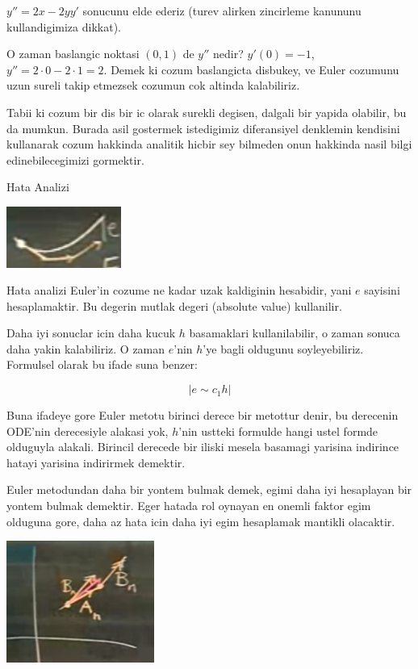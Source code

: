\documentclass[12pt,fleqn]{article}\usepackage{../common}
\begin{document}
$y'' = 2x - 2yy'$ sonucunu elde ederiz (turev alirken zincirleme kanununu
kullandigimiza dikkat).

O zaman baslangic noktasi $(0,1)$ de $y''$ nedir? $y'(0) = -1$, $y''= 2 \cdot 0
- 2\cdot 1 = 2$. 
Demek ki cozum baslangicta disbukey, ve Euler cozumunu uzun sureli takip
etmezsek cozumun cok altinda kalabiliriz. 

Tabii ki cozum bir dis bir ic olarak surekli degisen, dalgali bir yapida
olabilir, bu da mumkun. Burada asil gostermek istedigimiz diferansiyel denklemin
kendisini kullanarak cozum hakkinda analitik hicbir sey bilmeden onun hakkinda
nasil bilgi edinebilecegimizi gormektir. 

Hata Analizi

\includegraphics[height=2cm]{2_3.png}

Hata analizi Euler'in cozume ne kadar uzak kaldiginin hesabidir, yani $e$
sayisini hesaplamaktir. Bu degerin mutlak degeri (absolute value) kullanilir. 

Daha iyi sonuclar icin daha kucuk $h$ basamaklari kullanilabilir, o zaman sonuca
daha yakin kalabiliriz. O zaman $e$'nin $h$'ye bagli oldugunu
soyleyebiliriz. Formulsel olarak bu ifade suna benzer:

\[ |e \sim c_1 h| \]

Buna ifadeye gore Euler metotu birinci derece bir metottur denir, bu derecenin
ODE'nin derecesiyle alakasi yok, $h$'nin ustteki formulde hangi ustel formde
olduguyla alakali. Birincil derecede bir iliski mesela basamagi yarisina
indirince hatayi yarisina indirirmek demektir.

Euler metodundan daha bir yontem bulmak demek, egimi daha iyi hesaplayan bir
yontem bulmak demektir. Eger hatada rol oynayan en onemli faktor egim olduguna
gore, daha az hata icin daha iyi egim hesaplamak mantikli olacaktir. 

\includegraphics[height=4cm]{2_4.png}
\end{document}
